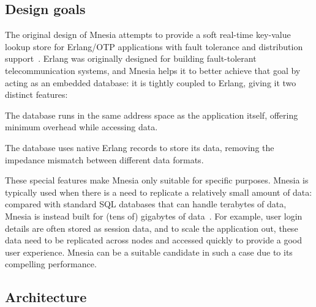 \subsection{Design goals} \label{subsec:bg mnesia design goal}

The original design of Mnesia attempts to provide a soft real-time key-value
lookup store for Erlang/OTP applications with fault tolerance and distribution
support~\cite{ericssonab2023mnesiaguide}.
Erlang was originally designed for building fault-tolerant telecommunication systems,
and Mnesia helps it to better achieve that goal by acting as an embedded database: 
it is tightly coupled to Erlang, giving it two distinct features:
\begin{enumerate*}[(a)]
  \item The database runs in the same address space as the application itself,
  offering minimum overhead while accessing data.
  \item The database uses native Erlang records to store its data,
  removing the impedance mismatch between different data formats.
\end{enumerate*}

These special features make Mnesia only suitable for specific purposes.
Mnesia is typically used when there is a need to replicate a 
relatively small amount of data: compared with standard SQL databases that can
handle terabytes of data, Mnesia is instead built for (tens of) gigabytes of 
data~\cite{hebert2013LYSE}.
For example, user login details are often stored as session data, and to 
scale the application out, these data need to be replicated across
nodes and accessed quickly to provide a good user experience. 
Mnesia can be a suitable candidate in such a case due to its compelling performance.

\subsection{Architecture} \label{subsec:bg mnesia arch}


